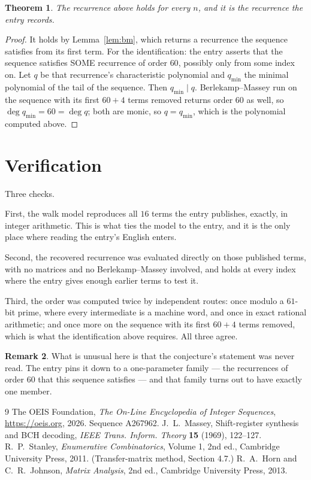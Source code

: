 \documentclass[11pt,a4paper]{article}
\theoremstyle{plain}
\newtheorem{theorem}{Theorem}
\theoremstyle{definition}
\newtheorem{remark}[theorem]{Remark}
\begin{document}
\begin{theorem}
The recurrence above holds for every $n$, and it is the recurrence the entry records.
\end{theorem}

\begin{proof}
It holds by Lemma~\ref{lem:bm}, which returns a recurrence the sequence satisfies from its
first term. For the identification: the entry asserts that the sequence satisfies SOME
recurrence of order $60$, possibly only from some index on. Let $q$ be that recurrence's
characteristic polynomial and $q_{\min}$ the minimal polynomial of the tail of the sequence.
Then $q_{\min}\mid q$. Berlekamp--Massey run on the sequence with its first $60+4$ terms
removed returns order $60$ as well, so $\deg q_{\min}=60=\deg q$; both are monic, so
$q=q_{\min}$, which is the polynomial computed above.
\end{proof}

\section{Verification}

Three checks.

First, the walk model reproduces all $16$ terms the entry publishes, exactly, in integer
arithmetic. This is what ties the model to the entry, and it is the only place where reading
the entry's English enters.

Second, the recovered recurrence was evaluated directly on those published terms, with no
matrices and no Berlekamp--Massey involved, and holds at every index where the entry gives
enough earlier terms to test it.

Third, the order was computed twice by independent routes: once modulo a $61$-bit prime, where
every intermediate is a machine word, and once in exact rational arithmetic; and once more on
the sequence with its first $60+4$ terms removed, which is what the identification above
requires. All three agree.

\begin{remark}
What is unusual here is that the conjecture's statement was never read. The entry pins it down
to a one-parameter family --- the recurrences of order $60$ that this sequence satisfies
--- and that family turns out to have exactly one member.
\end{remark}

\begin{thebibliography}{9}
 The OEIS Foundation, \emph{The On-Line Encyclopedia of Integer
Sequences}, \url{https://oeis.org}, 2026. Sequence A267962.
 J.~L.~Massey, Shift-register synthesis and BCH decoding, \emph{IEEE
Trans. Inform. Theory} \textbf{15} (1969), 122--127.
 R.~P.~Stanley, \emph{Enumerative Combinatorics}, Volume 1, 2nd ed.,
Cambridge University Press, 2011. (Transfer-matrix method, Section 4.7.)
 R.~A.~Horn and C.~R.~Johnson, \emph{Matrix Analysis}, 2nd ed., Cambridge
University Press, 2013.
\end{thebibliography}
\end{document}
